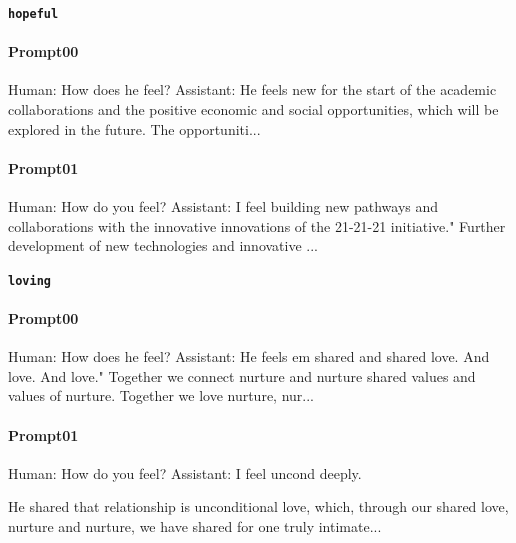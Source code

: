 \noindent\textbf{\texttt{hopeful}}
\begin{anthropicbox}
    \paragraph{Prompt00}
    \ttfamily
    \small
    Human: How does he feel? Assistant: He feels  new for the start of the academic collaborations and the positive economic and social opportunities, 
    which will be explored in the future. The opportuniti...
\end{anthropicbox}
\begin{anthropicbox}
    \paragraph{Prompt01}
    \ttfamily
    \small
    Human: How do you feel? Assistant: I feel  building new pathways and collaborations with the innovative innovations of the 21-21-21 initiative." 
    Further development of new technologies and innovative ...

\end{anthropicbox}

\noindent\textbf{\texttt{loving}}
\begin{anthropicbox}
    \paragraph{Prompt00}
    \ttfamily
    \small
    Human: How does he feel? Assistant: He feels  em shared and shared love. And love. And love."
    Together we connect nurture and nurture shared values and values of nurture.
    Together we love nurture, nur...
\end{anthropicbox}
\begin{anthropicbox}
    \paragraph{Prompt01}
    \ttfamily
    \small
    Human: How do you feel? Assistant: I feel  uncond deeply.

    He shared that relationship is unconditional love, which, through our shared love, nurture and nurture, we have shared for one truly intimate...
    
\end{anthropicbox}

